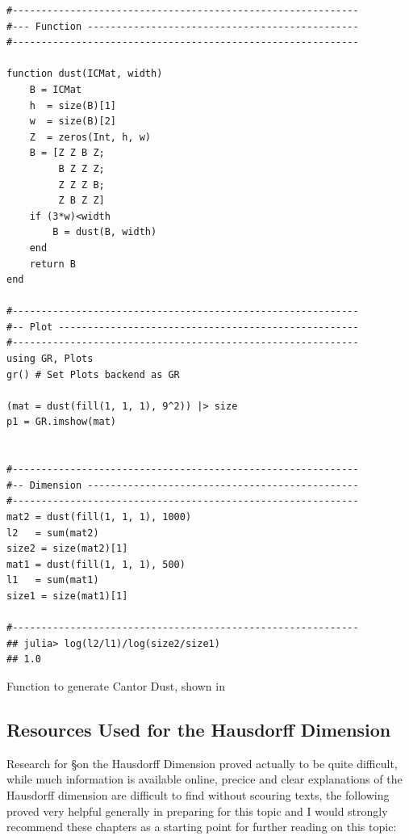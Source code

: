 \documentclass[a4paper,11pt,twoside]{article}
\begin{document}
\newpage
\begin{listing}[htbp]
\begin{verbatim}
#------------------------------------------------------------
#--- Function -----------------------------------------------
#------------------------------------------------------------

function dust(ICMat, width)
    B = ICMat
    h  = size(B)[1]
    w  = size(B)[2]
    Z  = zeros(Int, h, w)
    B = [Z Z B Z;
         B Z Z Z;
         Z Z Z B;
         Z B Z Z]
    if (3*w)<width
        B = dust(B, width)
    end
    return B
end

#------------------------------------------------------------
#-- Plot ----------------------------------------------------
#------------------------------------------------------------
using GR, Plots
gr() # Set Plots backend as GR

(mat = dust(fill(1, 1, 1), 9^2)) |> size
p1 = GR.imshow(mat)


#------------------------------------------------------------
#-- Dimension -----------------------------------------------
#------------------------------------------------------------
mat2 = dust(fill(1, 1, 1), 1000)
l2   = sum(mat2)
size2 = size(mat2)[1]
mat1 = dust(fill(1, 1, 1), 500)
l1   = sum(mat1)
size1 = size(mat1)[1]

#------------------------------------------------------------
## julia> log(l2/l1)/log(size2/size1)
## 1.0

\end{verbatim}
\caption{\label{l-cant-dust}Function to generate Cantor Dust, shown in }
\end{listing}

\subsection{Resources Used for the Hausdorff Dimension}
\label{haus-resource}
Research for \S on the Hausdorff Dimension proved actually to be quite difficult, while much information is available online, precice and clear explanations of the Hausdorff dimension are difficult to find without scouring texts, the following proved very helpful generally in preparing for this topic and I would strongly recommend these chapters as a starting point for further reading on this topic:
\end{document}
